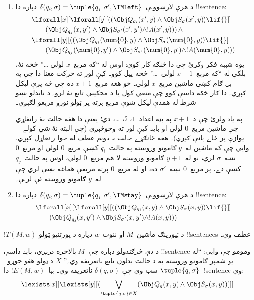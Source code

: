 \documentclass[../../../include/open-logic-section]{subfiles}
\begin{document}
\begin{enumerate}
\begin{enumerate}
\item {} د هرې لارښوونې~$\delta(q_i, \sigma) =
  \tuple{q_j, \sigma', \TMleft}$ دپاره دا !!{sentence}:
\begin{align*}
& \lforall[x][\lforall[y][
    ((\Obj Q_{q_i}(x', y) \land \Obj S_{\sigma}(x', y)) \lif {}]]\\
& \qquad   (\Obj Q_{q_j}(x, y') \land \Obj S_{\sigma'}(x', y') \land
!A(x', y))) \land {}\\
& \lforall[y][((\Obj Q_{q_i}(\num{0}, y) \land \Obj S_{\sigma}(\num{0},
    y)) \lif {}]\\
& \qquad (\Obj Q_{q_j}(\num{0}, y') \land \Obj S_{\sigma'}(\num{0},
  y') \land !A(\num{0}, y)))
\end{align*}
يوه شېبه فکر وکړئ چې دا څنګه کار کوي: اوس له ``که مربع~$x$ لولي
\dots'' څخه نۀ، بلکې له ``که مربع~$x+1$ لولي~\dots'' څخه پيل
کوو۔ کيڼ لور ته حرکت معنا دا چې په بل ګام کښې ماشين مربع~$x$ لولي۔
خو هغه مربع~$x+1$ ده چې څه پرې ليکل کېږي۔ دا کار ځکه داسې کوو چې
منفي کول يا د مخکيني تابع نۀ لرو۔
د نابدلو نښو شرط له همدې ليکل شوې مربع پرته پر ټولو نورو مربعو لګېږي۔

په ياد ولرئ چې د~$x+1$ په بڼه اعداد~$1$، $2$، \dots، دي؛ يعنې دا
هغه حالت نۀ رانغاړي چې ماشين مربع~$0$ لولي او بايد کيڼ لور ته وخوځېږي
(چې البته نۀ شي کولے---يوازې پر ځاے پاتې کېږي)۔ هغه ځانګړے حالت د
دويم عطف له خوا رانغاړل کېږي: وايي چې که ماشين له~$y$ ګامونو وروسته
په حالت~$q_i$ کښې مربع~$0$ لولي او مربع~$0$ نښه~$\sigma$ لري، نو
له~$y+1$ ګامونو وروسته لا هم مربع~$0$ لولي، اوس په حالت~$q_j$ کښې
دے، پر مربع~$0$ نښه~$\sigma'$ ده، او له مربع~$0$ پرته مربعې هماغه
نښې لري چې له~$y$ ګامونو وروسته ئې لرلې۔
\item {} د هرې لارښوونې~$\delta(q_i, \sigma) =
  \tuple{q_j, \sigma', \TMstay}$ دپاره دا !!{sentence}:
\begin{align*}
& \lforall[x][\lforall[y][(
   (\Obj Q_{q_i}(x, y) \land \Obj S_{\sigma}(x, y)) \lif {}]] \\
&\qquad   (\Obj Q_{q_j}(x, y') \land \Obj S_{\sigma'}(x, y') \land
!A(x, y)))
\end{align*}
\end{enumerate}
\end{enumerate}
$!T(M, w)$ د ټيورينګ ماشين~$M$ او ننوت~$w$ دپاره د پورتنيو ټولو
!!{sentence}s عطف وي۔

د دې څرګندولو دپاره چې~$M$ بالاخره درېږي، بايد داسې !!{sentence}
ومومو چې وايي: ``له يو شمېر ګامونو وروسته به د حالت بدلون تابع
ناتعريفه وي۔'' $X$ د ټولو هغو جوړو~$\tuple{q, \sigma}$ سټ وي چې
$\delta(q, \sigma)$ ناتعريفه وي۔ بيا~$!E(M, w)$ دا !!{sentence} وي:
\[
\lexists[x][\lexists[y][(\bigvee_{\tuple{q, \sigma} \in
      X}(\Obj Q_q(x, y) \land \Obj S_\sigma(x, y)))]]
\]
\end{document}
